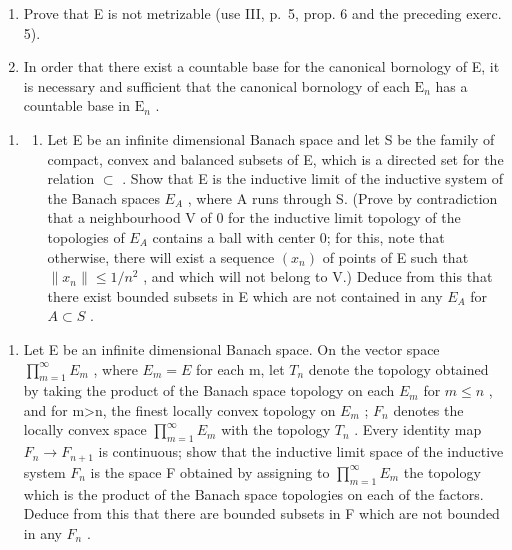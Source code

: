 \begin{enumerate}
\def\labelenumi{\alph{enumi})}
\tightlist
\item
  Prove that E is not metrizable (use III, p.~5, prop. 6 and the preceding exerc. 5).\\
\item
  In order that there exist a countable base for the canonical bornology of E, it is necessary and sufficient that the canonical bornology of each \(\mathrm{E}_n\) has a countable base in \(\mathrm{E}_n\) .
\end{enumerate}

\begin{enumerate}
\def\labelenumi{\arabic{enumi})}
\setcounter{enumi}{6}
\tightlist
\item
  \begin{enumerate}
  \def\labelenumii{\alph{enumii})}
  \tightlist
  \item
    Let E be an infinite dimensional Banach space and let S be the family of compact, convex and balanced subsets of E, which is a directed set for the relation \(\subset\) . Show that E is the inductive limit of the inductive system of the Banach spaces \(E_{A}\) , where A runs through S. (Prove by contradiction that a neighbourhood V of 0 for the inductive limit topology of the topologies of \(E_{A}\) contains a ball with center 0; for this, note that otherwise, there will exist a sequence \((x_{n})\) of points of E such that \(\|x_{n}\| \leqslant 1/n^{2}\) , and which will not belong to V.) Deduce from this that there exist bounded subsets in E which are not contained in any \(E_{A}\) for \(A \subset S\) .
  \end{enumerate}
\end{enumerate}

\begin{enumerate}
\def\labelenumi{\alph{enumi})}
\setcounter{enumi}{1}
\tightlist
\item
  Let E be an infinite dimensional Banach space. On the vector space \(\prod_{m=1}^{\infty}E_{m}\) , where \(E_{m}=E\) for each m, let \(T_{n}\) denote the topology obtained by taking the product of the Banach space topology on each \(E_{m}\) for \(m\leqslant n\) , and for m\textgreater n, the finest locally convex topology on \(E_{m}\) ; \(F_{n}\) denotes the locally convex space \(\prod_{m=1}^{\infty}E_{m}\) with the topology \(T_{n}\) . Every identity map \(F_{n}\to F_{n+1}\) is continuous; show that the inductive limit space of the inductive system \(F_{n}\) is the space F obtained by assigning to \(\prod_{m=1}^{\infty}E_{m}\) the topology which is the product of the Banach space topologies on each of the factors. Deduce from this that there are bounded subsets in F which are not bounded in any \(F_{n}\) .
\end{enumerate}

